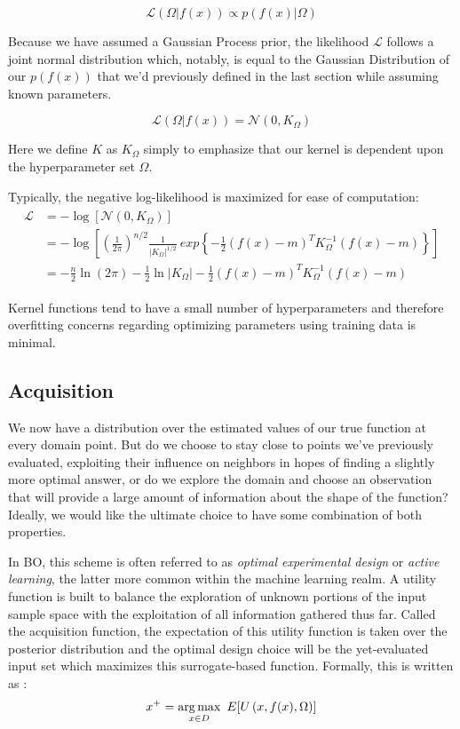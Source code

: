 \begin{equation}
\mathcal{L}(\Omega|f(x)) \propto p(f(x)|\Omega)
\end{equation}

Because we have assumed a Gaussian Process prior, the likelihood $\mathcal{L}$ follows a joint normal distribution which, notably, is equal to the Gaussian Distribution of our $p(f(x))$ that we'd previously defined in the last section while assuming known parameters.

\begin{equation}
\mathcal{L}(\Omega|f(x))= \mathcal{N}(0,K_\Omega)
\end{equation}

Here we define $K$ as $K_\Omega$ simply to emphasize that our kernel is dependent upon the hyperparameter set $\Omega$.

Typically, the negative log-likelihood is maximized for ease of computation:
\begin{align}
\begin{split}
\mathcal{L} & = - \log \left[\mathcal{N}(0,K_\Omega)\right] \\
& = - \log \left[\left(\frac{1}{2\pi}\right)^{n/2} \frac{1}{|K_\Omega|^{1/2}} \ exp\left\{-\frac{1}{2}(f(x)-m)^TK^{-1}_\Omega (f(x)-m)\right\}\right] \\
& = -\frac{n}{2} \ln(2\pi) - \frac{1}{2} \ln|K_\Omega| - \frac{1}{2}(f(x)-m)^TK^{-1}_\Omega (f(x)-m)
\end{split}
\end{align}

Kernel functions tend to have a small number of hyperparameters and therefore overfitting concerns regarding optimizing parameters using training data is minimal. 

\subsection{Acquisition}

We now have a distribution over the estimated values of our true function at every domain point. But do we choose to stay close to points we've previously evaluated, exploiting their influence on neighbors in hopes of finding a slightly more optimal answer, or do we explore the domain and choose an observation that will provide a large amount of information about the shape of the function? Ideally, we would like the ultimate choice to have some combination of both properties.

In BO, this scheme is often referred to as \textit{optimal experimental design} or \textit{active learning}, the latter more common within the machine learning realm. A utility function is built to balance the exploration of unknown portions of the input sample space with the exploitation of all information gathered thus far. Called the acquisition function, the expectation of this utility function is taken over the posterior distribution and the optimal design choice will be the yet-evaluated input set which maximizes this surrogate-based function. Formally, this is written as \cite{ryan_contributions_2014}:
\begin{equation}
x^+=\operatorname*{arg\,max}_{x \in D} ~ E[U\left(x,f(x),\Omega)\right]
\end{equation}

